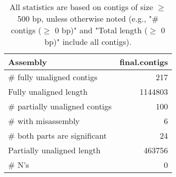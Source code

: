 \documentclass[12pt,a4paper]{article}
\begin{document}
\begin{table}[ht]
\begin{center}
\caption{All statistics are based on contigs of size $\geq$ 500 bp, unless otherwise noted (e.g., "\# contigs ($\geq$ 0 bp)" and "Total length ($\geq$ 0 bp)" include all contigs).}
\begin{tabular}{|l*{1}{|r}|}
\hline
Assembly & final.contigs \\ \hline
\# fully unaligned contigs & 217 \\ \hline
Fully unaligned length & 1144803 \\ \hline
\# partially unaligned contigs & 100 \\ \hline
\hspace{5mm}\# with misassembly & 6 \\ \hline
\hspace{5mm}\# both parts are significant & 24 \\ \hline
Partially unaligned length & 463756 \\ \hline
\# N's & 0 \\ \hline
\end{tabular}
\end{center}
\end{table}
\end{document}
